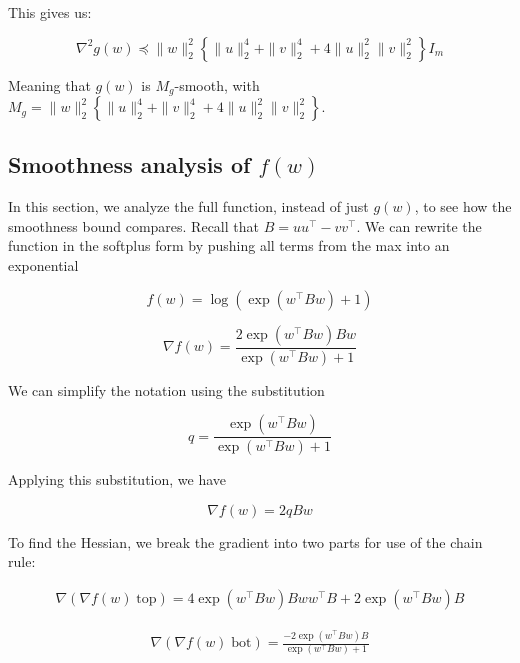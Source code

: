 \documentclass[11pt]{article}
\begin{document}
This gives us:

\begin{equation}
    \nabla^2 g(w) \preceq \|w\|_2^2 \left\{ \|u\|_2^4 + \|v\|_2^4 + 4 \|u\|_2^2 \|v\|_2^2 \right\} I_m
\end{equation}

Meaning that $g(w)$ is $M_g$-smooth, with $M_g = \|w\|_2^2 \left\{ \|u\|_2^4 + \|v\|_2^4 + 4 \|u\|_2^2 \|v\|_2^2 \right\}$.

\subsection{Smoothness analysis of $f(w)$}

In this section, we analyze the full function, instead of just $g(w)$, to see how the smoothness bound compares. Recall that $B = uu^\top - vv^\top$. We can rewrite the function in the softplus form by pushing all terms from the max into an exponential

\begin{equation}
\label{eq:f}
    f(w) = \log(\exp(w^{\top}Bw) + 1)
\end{equation}

\begin{equation}
    \nabla f(w) = \frac{2 \exp(w^{\top}Bw)Bw}{\exp(w^{\top}Bw) + 1}
\end{equation}

We can simplify the notation using the substitution

\begin{equation}
q = \frac{\exp(w^{\top}Bw)}{\exp(w^{\top}Bw) + 1}
\end{equation}

Applying this substitution, we have

\begin{equation}
\label{eq:grad_f}
    \nabla f(w) = 2qBw
\end{equation}

To find the Hessian, we break the gradient into two parts for use of the chain rule:

\begin{align*}
    \nabla (\nabla f(w) \; \textrm{top}) = 4 \exp(w^{\top}Bw)Bww^{\top}B  + 2 \exp(w^{\top}Bw)B
\end{align*}

\begin{align*}
    \nabla (\nabla f(w) \; \textrm{bot}) = \frac{-2 \exp(w^{\top}Bw)B}{\exp(w^{\top}Bw) + 1}
\end{align*}
\end{document}

